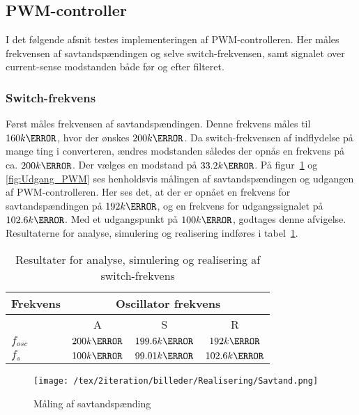 
\subsection{PWM-controller}
I det følgende afsnit testes implementeringen af PWM-controlleren. Her måles frekvensen af savtandspændingen og selve switch-frekvensen, samt signalet over current-sense modstanden både før og efter filteret.

\subsubsection{Switch-frekvens}
Først måles frekvensen af savtandspændingen. Denne frekvens måles til $160k\hertz$, hvor der ønskes $200k\hertz$. Da switch-frekvensen af indflydelse på mange ting i converteren, ændres modstanden således der opnås en frekvens på ca. $200k\hertz$. Der vælges en modstand på $33.2k\ohm$. På figur~\ref{fig:Savtand} og \ref{fig:Udgang_PWM} ses henholdsvis målingen af savtandspændingen og udgangen af PWM-controlleren. Her ses det, at der er opnået en frekvens for savtandspændingen på $192k\hertz$, og en frekvens for udgangssignalet på $102.6k\hertz$. Med et udgangspunkt på $100k\hertz$, godtages denne afvigelse. Resultaterne for analyse, simulering og realisering indføres i tabel~\ref{tab:resultat_switch_frekvens}.


\begin{table}[H] 			
	\centering
	\begin{tabularx}{\textwidth}{|X|c|c|c|}
		\hline
		\textbf{Frekvens} & \multicolumn{3}{|c|}{\textbf{Oscillator frekvens}} 										\\ \hline
		& A & S & R 									\\ \hline
		$f_{osc}$ & $200k\hertz$ & $199.6k\hertz$ & $192k\hertz$ 									\\ \hline 
		$f_s$ & $100k\hertz$ & $99.01k\hertz$ & $102.6k\hertz$ 									\\ \hline
	\end{tabularx}
	\caption{Resultater for analyse, simulering og realisering af switch-frekvens}
	\label{tab:resultat_switch_frekvens}
\end{table}


\begin{figure}[H]
	\center
	\texttt{[image: /tex/2iteration/billeder/Realisering/Savtand.png]}
	\caption{Måling af savtandspænding}
	\label{fig:Savtand}
\end{figure} 

